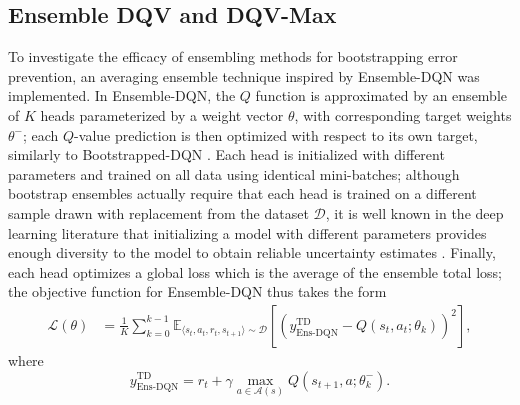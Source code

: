 \subsection{Ensemble DQV and DQV-Max}
To investigate the efficacy of ensembling methods for
bootstrapping error prevention, an averaging ensemble
technique inspired by Ensemble-DQN \citep{agarwal2020optimistic} was
implemented.
In Ensemble-DQN, the $Q$ function is approximated by
an ensemble of $K$ heads parameterized by a weight vector $\theta$,
with corresponding target weights $\theta^-$; each $Q$-value
prediction
is then optimized with respect to its own target,
similarly to Bootstrapped-DQN \citep{osband2016deep}. Each head is
initialized with different parameters and trained on all data using
identical mini-batches; although bootstrap ensembles actually require
that each head is trained on a different sample drawn with
replacement from the dataset $\mathcal{D}$, it is well known in the
deep learning literature that
initializing a model with different parameters provides enough
diversity to the model to obtain reliable uncertainty estimates
\citep{osband2016deep,levine2020offline}. Finally, each head optimizes
a global loss which is the average of the ensemble total loss; the
objective function for Ensemble-DQN thus takes the form
\begin{align}
\mathcal{L}\left(\theta\right)&=\frac{1}{K}\sum_{k=0}^{k-1}\mathbb{E}_{\langle
                     s_t,a_t,r_t,s_{t+1}\rangle\sim\mathcal{D}}\left[{\left(y^{\scriptscriptstyle\textrm{TD}}_{\scriptscriptstyle\textrm{Ens-DQN}}-Q\left(s_t,a_t;\theta_{k}\right)\right)}^2\right],
\end{align}
where
\begin{equation}
  y^{\scriptscriptstyle\textrm{TD}}_{\scriptscriptstyle\textrm{Ens-DQN}}=r_t+\gamma\max_{a\in\mathcal{A}\left(s\right)}Q\left(s_{t+1},a;\theta_{k}^{-}\right).
\end{equation}

